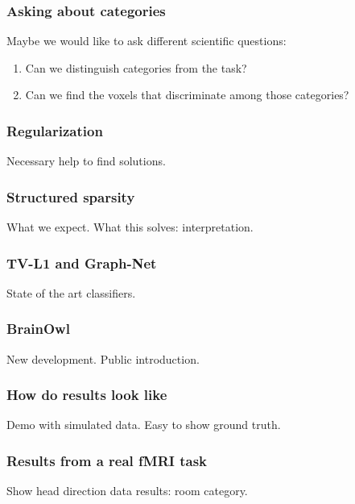 \documentclass[11pt]{beamer}
\begin{document}
\begin{frame}
    \frametitle{Asking about categories}

    Maybe we would like to ask different scientific questions:
    \begin{enumerate}
        \item Can we distinguish categories from the task?
        \item Can we find the voxels that discriminate among those categories?
    \end{enumerate}

\end{frame}
\begin{frame}
    \frametitle{Regularization}
    Necessary help to find solutions.
\end{frame}
\begin{frame}
    \frametitle{Structured sparsity}
    What we expect. What this solves: interpretation.
\end{frame}
\begin{frame}
    \frametitle{TV-L1 and Graph-Net}
    State of the art classifiers.    
\end{frame}
\begin{frame}
    \frametitle{BrainOwl}
    New development. Public introduction.
\end{frame}
\begin{frame}
    \frametitle{How do results look like}
    Demo with simulated data. Easy to show ground truth. 
\end{frame}
\begin{frame}
    \frametitle{Results from a real fMRI task}
    Show head direction data results: room category. 
\end{frame}
\end{document}
